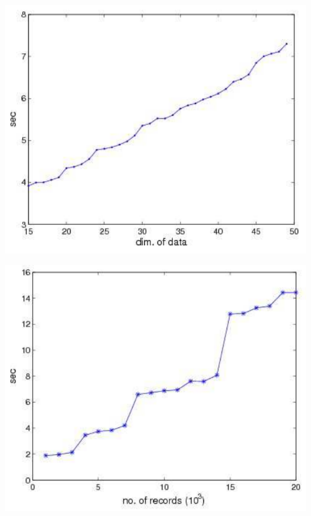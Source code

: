 \begin{minipage}[b]{0.4\textwidth}
	\centering
	\includegraphics[width=\textwidth]{figures/dataDimensions.pdf}
	\label{fig:dd_nonfloagting}
\end{minipage}
\begin{minipage}[b]{0.4\textwidth}
	\centering
	\includegraphics[width=\textwidth]{figures/dataSize.pdf}
	\label{fig:ds_nonfloagting}
\end{minipage}
\vspace{\baselineskip}

